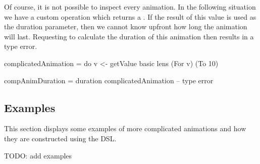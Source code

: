 Of course, it is not possible to inspect every animation. In the following situation we have a custom operation  which returns a . If the result of this value is used as the duration parameter, then we cannot know upfront how long the animation will last. Requesting to calculate the duration of this animation then results in a type error.

\begin{spec}
complicatedAnimation = do
  v <- getValue
  basic lens (For v) (To 10)

compAnimDuration = duration complicatedAnimation
-- type error
\end{spec}

\subsection{Examples}

This section displays some examples of more complicated animations and how they are constructed using the DSL.

TODO: add examples

